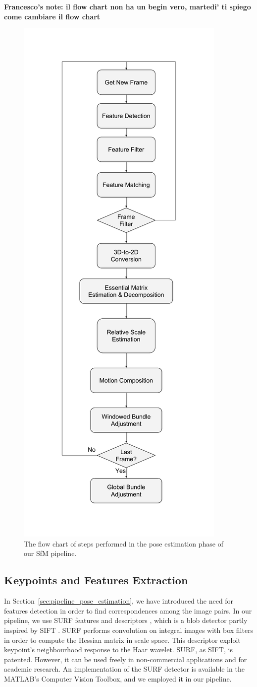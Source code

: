 \textbf{Francesco's note: il flow chart non ha un begin vero, martedi' ti spiego come cambiare il flow chart}
\begin{figure}
	\centering
	\includegraphics[width=0.5\linewidth]{img/sfm_block.pdf}
	\caption{The flow chart of steps performed in the pose estimation 
	phase of our SfM pipeline.}
	\label{fig:sfm_block}
\end{figure}

\subsection{Keypoints and Features Extraction}
In Section~\ref{sec:pipeline_pose_estimation}, we have introduced the need for 
features detection in order to find correspondences among the image pairs.
In our pipeline, we use SURF features and descriptors 
\cite{bay2006surf}, which is a blob detector partly inspired by SIFT
\cite{lowe1999object}. SURF performs convolution on integral images with box filters in order to 
compute the Hessian matrix in scale space.
This descriptor exploit keypoint's neighbourhood response to the Haar wavelet.
SURF, as SIFT, is patented. However, it can be used freely in non-commercial
applications and for academic research.
An implementation of the SURF detector is available in the MATLAB's Computer 
Vision Toolbox, and we employed it in our pipeline.

